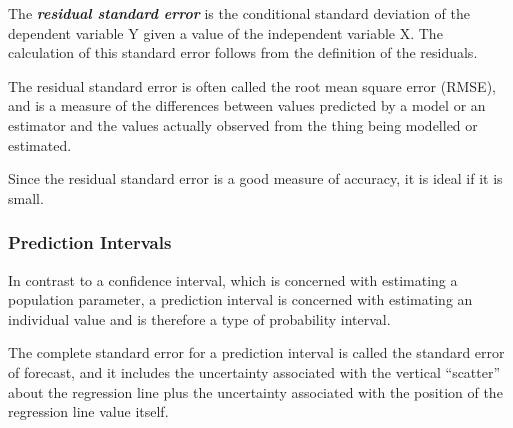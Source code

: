 The \textbf{\emph{residual standard error}} is the conditional standard deviation of the dependent variable Y given a value of the independent variable X. The calculation of this standard error follows from the definition of the residuals.

The residual standard error is often called the root mean square error (RMSE), and is a measure of the differences between values predicted by a model or an estimator and the values actually observed from the thing being modelled or estimated.

Since the residual standard error is a good measure of accuracy, it is ideal if it is small.

\subsubsection{Prediction Intervals}
In contrast to a confidence interval, which is concerned with estimating a population parameter, a prediction interval is concerned with estimating an individual value and is therefore a type of probability interval. 

The complete standard error for a prediction interval is called the standard error of forecast, and it includes the uncertainty associated with the vertical “scatter” about the regression line plus the uncertainty associated with the position of the regression line value itself.




